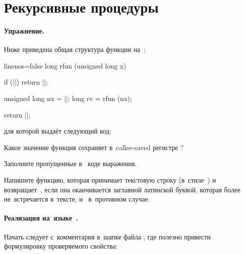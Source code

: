 \section{Рекурсивные процедуры}

\paragraph{Упражнение.}
Ниже приведена общая структура функции на~:

{\newcommand*{\ans}{\ansfw{4em}}%
  \begin{ccode*}{linenos=false}
    long rfun (unsigned long x)
    {
      if (|\ans{x == 0}|) return |\ans{0}|;

      unsigned long nx = |\ans{x >> 2}|;
      long rv = rfun (nx);

      return |\ans{x + rv}|;
    }
  \end{ccode*}
}

\noindent для которой \GCC{} выдаёт следующий код:


\begin{enumIssue}
  \item Какое значение функция  сохраняет в~\textenglish{callee-saved} регистре ?
  \item Заполните пропущенные в~ коде выражения.
\end{enumIssue}



\WhatToReadSection
\citeauthor[глава~3, стр.~274--291]{Bryant:2016:en}



\ExercisesSection
Напишите функцию, которая принимает текстовую строку (в~стиле~) и возвращает~, если она оканчивается заглавной латинской буквой, которая более не~встречается в~тексте, и~ в~противном случае.



\paragraph{Реализация на~языке~.}
Начать следует с~комментария в~шапке файла , где полезно привести формулировку проверяемого свойства:

